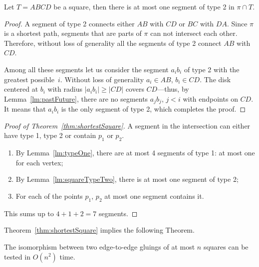 \documentclass[a4paper,11pt]{article}
\begin{document}
\begin{lemma}
\label{lm:squareTypeTwo}
	Let $T = ABCD$ be a square, then there is at most one segment
	of type 2 in $\pi \cap T$.
\end{lemma}

\begin{proof}
	A segment of type 2 connects either $AB$ with $CD$ or $BC$ with $DA$. Since $\pi$ is a shortest path, segments that are parts of $\pi$ can not intersect each other. Therefore, without loss of generality all the segments of type 2 connect $AB$ with $CD$.
	
	Among all these segments let us consider the segment $a_ib_i$ of type 2 with the greatest possible~$i$. Without loss of generality $a_i \in AB$, $b_i \in CD$. The disk centered at $b_i$ with radius $|a_ib_i| \ge |CD|$ covers $CD$—thus, by Lemma~\ref{lm:pastFuture}, there are no segments $a_jb_j$, $j<i$ with endpoints on $CD$. It means that $a_ib_i$ is the only segment of type 2, which completes the proof.
\end{proof}

\begin{proof}[Proof of Theorem~\ref{thm:shortestSquare}]

	A segment in the intersection can either have type 1, type 2 or contain $p_1$ or $p_2$.
	
\begin{enumerate}
	
	\item By Lemma~\ref{lm:typeOne}, there are at most 4 segments of type 1: at most one for each vertex;
	
	\item By Lemma~\ref{lm:squareTypeTwo}, there is at most one segment of type 2;
	
	\item For each of the points $p_1$, $p_2$ at most one segment contains it.

\end{enumerate}

	This sums up to $4+1+2=7$ segments.

\end{proof}

Theorem~\ref{thm:shortestSquare} implies the following Theorem.

\begin{theorem} \label{thm:chruntime}
	The isomorphism between two edge-to-edge gluings of at most $n$ squares can be tested in $O(n^2)$ time.
\end{theorem}
\end{document}
